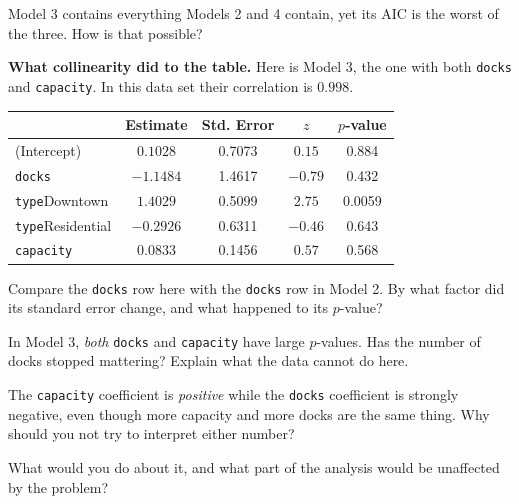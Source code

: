\documentclass[11pt]{article}
\newcommand{\answerspace}[1]{\vspace{#1}}
\begin{document}
\begin{questions}
\begin{parts}
\item Model 3 contains everything Models 2 and 4 contain, yet its AIC is the worst of the three.
How is that possible?
\answerspace{4em}
\end{parts}

\item \textbf{What collinearity did to the table.} Here is Model 3, the one with both
\texttt{docks} and \texttt{capacity}. In this data set their correlation is $0.998$.

\begin{center}
\renewcommand{\arraystretch}{1.2}
\begin{tabular}{lcccc}
\toprule
 & \textbf{Estimate} & \textbf{Std. Error} & \textbf{$z$} & \textbf{$p$-value} \\
\midrule
(Intercept) & $0.1028$ & 0.7073 & $0.15$ & 0.884 \\
\texttt{docks} & $-1.1484$ & 1.4617 & $-0.79$ & 0.432 \\
\texttt{type}Downtown & $1.4029$ & 0.5099 & $2.75$ & 0.0059 \\
\texttt{type}Residential & $-0.2926$ & 0.6311 & $-0.46$ & 0.643 \\
\texttt{capacity} & $0.0833$ & 0.1456 & $0.57$ & 0.568 \\
\bottomrule
\end{tabular}
\end{center}

\begin{parts}
\item Compare the \texttt{docks} row here with the \texttt{docks} row in Model 2. By what factor
did its standard error change, and what happened to its $p$-value?
\answerspace{3.5em}

\item In Model 3, \emph{both} \texttt{docks} and \texttt{capacity} have large $p$-values. Has the
number of docks stopped mattering? Explain what the data cannot do here.
\answerspace{4.5em}

\item The \texttt{capacity} coefficient is \emph{positive} while the \texttt{docks} coefficient is
strongly negative, even though more capacity and more docks are the same thing. Why should you not
try to interpret either number?
\answerspace{4.5em}

\item What would you do about it, and what part of the analysis would be unaffected by the problem?
\answerspace{4em}
\end{parts}


\end{questions}
\end{document}
